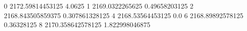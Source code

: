 0 2172.59814453125 4.0625
1 2169.0322265625 0.49658203125
2 2168.843505859375 0.307861328125
4 2168.53564453125 0.0
6 2168.89892578125 0.36328125
8 2170.358642578125 1.822998046875
